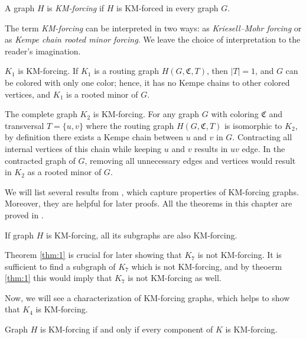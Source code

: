 \begin{defn}[KM-forcing]
 A graph $H$ is \emph{KM-forcing} if $H$ is KM-forced in every graph $G$.
\end{defn}

\begin{rem}
 The term \emph{KM-forcing} can be interpreted in two ways: as \emph{Kriesell–Mohr forcing} or as \emph{Kempe chain rooted minor forcing}. We leave the choice of interpretation to the reader's imagination.
\end{rem}

\begin{example}
    $K_1$ is KM-forcing. If $K_1$ is a routing graph $H(G, \mathfrak{C}, T)$, then $|T| = 1$, and $G$
can be colored with only one color; hence, it has no Kempe chains to other colored vertices, and $K_1$ is a rooted minor of $G$.
\end{example}

\begin{example}
 The complete graph $K_2$ is KM-forcing. 
 For any graph $G$ with coloring $\mathfrak{C}$ and transversal $T = \{u,v\}$ where the routing graph $H(G, \mathfrak{C}, T)$ is
 isomorphic to $K_2$, by definition there exists a Kempe chain between $u$ and $v$ in $G$. 
 Contracting all internal vertices of this chain while keeping $u$ and $v$ results in $uv$ edge. In the contracted graph of $G$,
 removing all unnecessary edges and vertices would result in $K_2$ as a rooted minor of $G$.
\end{example}

We will list several results from \cite{matthias_2022}, which capture properties of KM-forcing graphs. Moreover, they are helpful 
for later proofs. All the theorems in this chapter are proved in \cite{matthias_2022}.

\begin{thm}
\label{thm:1}
 If graph $H$ is KM-forcing, all its subgraphs are also KM-forcing.
\end{thm}

Theorem \ref{thm:1} is crucial for later showing that $K_7$ is not KM-forcing. It is sufficient to find a subgraph 
of $K_7$ which is not KM-forcing, and by theoerm \ref{thm:1} this would imply that $K_7$ is not KM-forcing as well.

Now, we will see a characterization of KM-forcing graphs, which helps to show that $K_4$ is KM-forcing.

\begin{thm}
\label{thm:1.5}
 Graph $H$ is KM-forcing if and only if every component of $K$ is KM-forcing.
\end{thm}

